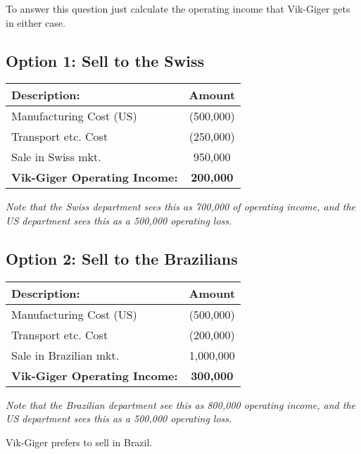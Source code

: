To answer this question just calculate the operating income that
Vik-Giger gets in either case.

\hypertarget{option-1-sell-to-the-swiss}{%
\subsection{\texorpdfstring{\textbf{Option 1: Sell to the
Swiss}}{Option 1: Sell to the Swiss}}\label{option-1-sell-to-the-swiss}}

\begin{longtable}[]{@{}lc@{}}
\toprule\noalign{}
Description: & Amount \\
\midrule\noalign{}
\endhead
\bottomrule\noalign{}
\endlastfoot
Manufacturing Cost (US) & (500,000) \\
Transport etc. Cost & (250,000) \\
Sale in Swiss mkt. & 950,000 \\
\textbf{Vik-Giger Operating Income:} & \textbf{200,000} \\
\end{longtable}

\emph{Note that the Swiss department sees this as 700,000 of operating
income, and the US department sees this as a 500,000 operating loss.}

\hypertarget{option-2-sell-to-the-brazilians}{%
\subsection{\texorpdfstring{\textbf{Option 2: Sell to the
Brazilians}}{Option 2: Sell to the Brazilians}}\label{option-2-sell-to-the-brazilians}}

\begin{longtable}[]{@{}lc@{}}
\toprule\noalign{}
Description: & Amount \\
\midrule\noalign{}
\endhead
\bottomrule\noalign{}
\endlastfoot
Manufacturing Cost (US) & (500,000) \\
Transport etc. Cost & (200,000) \\
Sale in Brazilian mkt. & 1,000,000 \\
\textbf{Vik-Giger Operating Income:} & \textbf{300,000} \\
\end{longtable}

\emph{Note that the Brazilian department see this as 800,000 operating
income, and the US department sees this as a 500,000 operating loss.}

Vik-Giger prefers to sell in Brazil.

